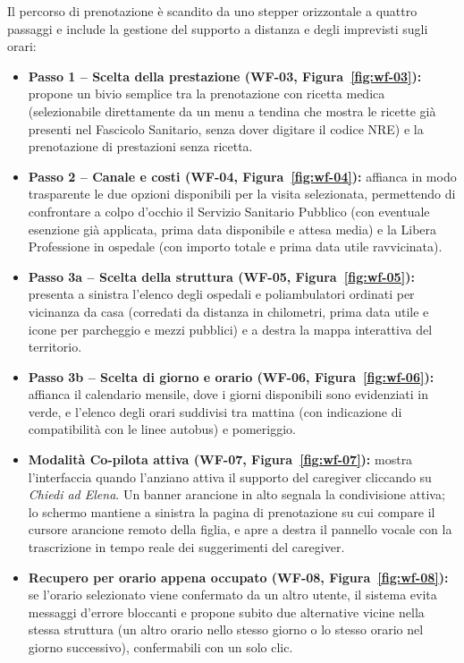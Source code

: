 Il percorso di prenotazione è scandito da uno stepper orizzontale a quattro passaggi e include la gestione del supporto a distanza e degli imprevisti sugli orari:
\begin{itemize}
\item \textbf{Passo 1 -- Scelta della prestazione (WF-03, Figura~\ref{fig:wf-03}):} propone un bivio semplice tra la prenotazione con ricetta medica (selezionabile direttamente da un menu a tendina che mostra le ricette già presenti nel Fascicolo Sanitario, senza dover digitare il codice NRE) e la prenotazione di prestazioni senza ricetta.
\item \textbf{Passo 2 -- Canale e costi (WF-04, Figura~\ref{fig:wf-04}):} affianca in modo trasparente le due opzioni disponibili per la visita selezionata, permettendo di confrontare a colpo d'occhio il Servizio Sanitario Pubblico (con eventuale esenzione già applicata, prima data disponibile e attesa media) e la Libera Professione in ospedale (con importo totale e prima data utile ravvicinata).
\item \textbf{Passo 3a -- Scelta della struttura (WF-05, Figura~\ref{fig:wf-05}):} presenta a sinistra l'elenco degli ospedali e poliambulatori ordinati per vicinanza da casa (corredati da distanza in chilometri, prima data utile e icone per parcheggio e mezzi pubblici) e a destra la mappa interattiva del territorio.
\item \textbf{Passo 3b -- Scelta di giorno e orario (WF-06, Figura~\ref{fig:wf-06}):} affianca il calendario mensile, dove i giorni disponibili sono evidenziati in verde, e l'elenco degli orari suddivisi tra mattina (con indicazione di compatibilità con le linee autobus) e pomeriggio.
\item \textbf{Modalità Co-pilota attiva (WF-07, Figura~\ref{fig:wf-07}):} mostra l'interfaccia quando l'anziano attiva il supporto del caregiver cliccando su \emph{Chiedi ad Elena}. Un banner arancione in alto segnala la condivisione attiva; lo schermo mantiene a sinistra la pagina di prenotazione su cui compare il cursore arancione remoto della figlia, e apre a destra il pannello vocale con la trascrizione in tempo reale dei suggerimenti del caregiver.
\item \textbf{Recupero per orario appena occupato (WF-08, Figura~\ref{fig:wf-08}):} se l'orario selezionato viene confermato da un altro utente, il sistema evita messaggi d'errore bloccanti e propone subito due alternative vicine nella stessa struttura (un altro orario nello stesso giorno o lo stesso orario nel giorno successivo), confermabili con un solo clic.

\end{itemize}
